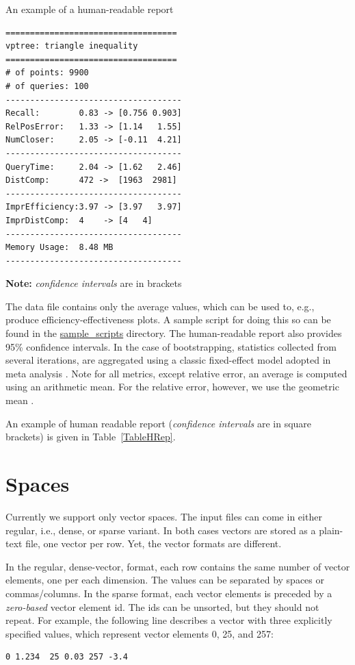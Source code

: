 \documentclass[runningheads,a4paper]{llncs}
\begin{document}
{\begin{table}
\caption{An example of a human-readable report 
\label{TableHRep}}
\begin{verbatim}
===================================
vptree: triangle inequality
===================================
# of points: 9900
# of queries: 100
------------------------------------
Recall:        0.83 -> [0.756 0.903]
RelPosError:   1.33 -> [1.14   1.55]
NumCloser:     2.05 -> [-0.11  4.21]
------------------------------------
QueryTime:     2.04 -> [1.62   2.46]
DistComp:      472 ->  [1963  2981]
------------------------------------
ImprEfficiency:3.97 -> [3.97   3.97]
ImprDistComp:  4    -> [4   4]
------------------------------------
Memory Usage:  8.48 MB
------------------------------------
\end{verbatim}
\textbf{Note:} \emph{confidence intervals} are in brackets
\vspace{-4em}
\end{table}

The data file contains only the average values,
which can be used to, e.g., produce efficiency-effectiveness plots.
A sample script for doing this so can be found in the \href{https://github.com/searchivarius/NonMetricSpaceLib/blob/master/sample_scripts/nips2013/figures/all.sh}{sample\_scripts} directory.
The human-readable report also provides 95\% confidence intervals.
In the case of bootstrapping, statistics collected from several iterations,
are aggregated using a classic fixed-effect model adopted in meta analysis \cite{Hedges_and_Vevea:1998}.
Note for all metrics, except relative error, an average is computed using an arithmetic mean.
For the relative error, however, we use the geometric mean  \cite{king:1986}.

An example of human readable report (\emph{confidence intervals} are in square brackets)
is given in Table~\ref{TableHRep}.

\section{Spaces}\label{SectionSpaces}
Currently we support only vector spaces.
The input files can come in either regular, i.e., dense,
or sparse variant. 
In both cases vectors are stored
as a plain-text file, one vector per row.
Yet, the vector formats are different.

In the regular, dense-vector, format, each row
contains the same number of vector elements, one per each dimension.
The values can be separated by spaces or commas/columns.
In the sparse format, each vector elements is preceded
by a \emph{zero-based} vector element id. 
The ids can be unsorted, but they should not repeat.
For example, the following line
describes a vector with three explicitly specified values,
which represent vector elements 0, 25, and 257:
\begin{verbatim}
0 1.234  25 0.03 257 -3.4 
\end{verbatim}

}
\end{document}
